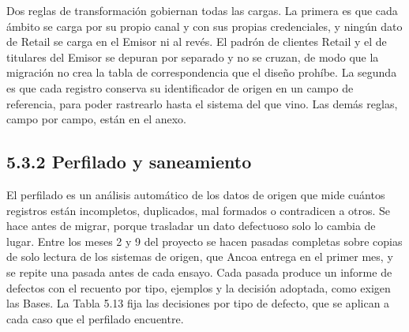 \documentclass[11pt]{article}
\begin{document}
Dos reglas de transformación gobiernan todas las cargas. La primera es que cada ámbito se carga por su propio canal y con sus propias credenciales, y ningún dato de Retail se carga en el Emisor ni al revés. El padrón de clientes Retail y el de titulares del Emisor se depuran por separado y no se cruzan, de modo que la migración no crea la tabla de correspondencia que el diseño prohíbe. La segunda es que cada registro conserva su identificador de origen en un campo de referencia, para poder rastrearlo hasta el sistema del que vino. Las demás reglas, campo por campo, están en el anexo.

\subsection{5.3.2 Perfilado y saneamiento}

El perfilado es un análisis automático de los datos de origen que mide cuántos registros están incompletos, duplicados, mal formados o contradicen a otros. Se hace antes de migrar, porque trasladar un dato defectuoso solo lo cambia de lugar. Entre los meses 2 y 9 del proyecto se hacen pasadas completas sobre copias de solo lectura de los sistemas de origen, que Ancoa entrega en el primer mes, y se repite una pasada antes de cada ensayo. Cada pasada produce un informe de defectos con el recuento por tipo, ejemplos y la decisión adoptada, como exigen las Bases. La Tabla 5.13 fija las decisiones por tipo de defecto, que se aplican a cada caso que el perfilado encuentre.
\end{document}
